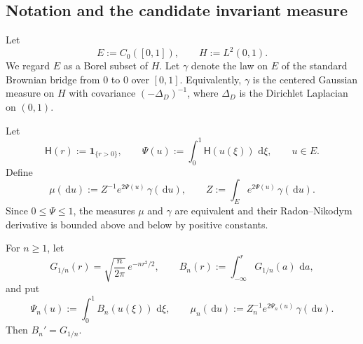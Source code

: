 \documentclass[12pt]{article}
\numberwithin{equation}{section}
\newcommand{\dd}{\,\mathrm d}
\newcommand{\1}{\mathbf 1}
\begin{document}
\date{}



\begin{abstract}
We prove that the Markov semigroup associated with the Dirichlet stochastic heat
equation with drift $\delta_0(u)$ has at most one invariant probability measure.
In fact, under the hypotheses stated in the question, the invariant measure is unique
and is the Gibbs perturbation of the Brownian bridge measure
\[
        \mu(\dd u)=Z^{-1}\exp\!\left(2\int_0^1 \1_{\{u(\xi)>0\}}\dd \xi\right)\gamma(\dd u),
\]
where $\gamma$ is the law of the standard Brownian bridge on $[0,1]$.
The proof uses three inputs: the reversible Gibbs structure of smooth approximations,
the absolute-continuity theorem of Bounebache--Zambotti for the associated
Dirichlet-form resolvent, and irreducibility of the weighted Ornstein--Uhlenbeck
Dirichlet form.
\end{abstract}

\subsection{Notation and the candidate invariant measure}

Let
\[
        E:=C_0([0,1]),\qquad H:=L^2(0,1).
\]
We regard $E$ as a Borel subset of $H$. Let $\gamma$ denote the law on $E$ of the
standard Brownian bridge from $0$ to $0$ over $[0,1]$. Equivalently, $\gamma$ is the
centered Gaussian measure on $H$ with covariance $(-\Delta_D)^{-1}$, where
$\Delta_D$ is the Dirichlet Laplacian on $(0,1)$.

Let
\[
        \mathsf H(r):=\1_{\{r>0\}},\qquad
        \Psi(u):=\int_0^1 \mathsf H(u(\xi))\,\dd \xi,\qquad u\in E.
\]
Define
\begin{equation}\label{eq:mu-def}
        \mu(\dd u)
        := Z^{-1}e^{2\Psi(u)}\,\gamma(\dd u),
        \qquad
        Z:=\int_E e^{2\Psi(u)}\,\gamma(\dd u).
\end{equation}
Since $0\leq \Psi\leq 1$, the measures $\mu$ and $\gamma$ are equivalent and their
Radon--Nikodym derivative is bounded above and below by positive constants.

For $n\geq 1$, let
\[
        G_{1/n}(r)=\sqrt{\frac{n}{2\pi}}\,e^{-nr^2/2},\qquad
        B_n(r):=\int_{-\infty}^r G_{1/n}(a)\,\dd a,
\]
and put
\[
        \Psi_n(u):=\int_0^1 B_n(u(\xi))\,\dd \xi,\qquad
        \mu_n(\dd u):=Z_n^{-1}e^{2\Psi_n(u)}\,\gamma(\dd u).
\]
Then $B_n'=G_{1/n}$.
\end{document}
